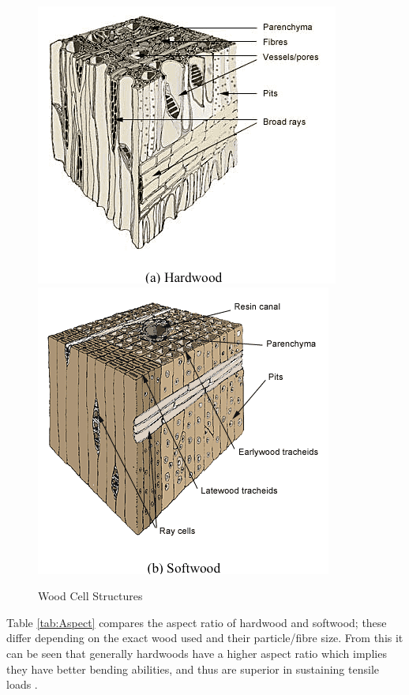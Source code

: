 \documentclass[11pt,a4paper]{article}
\numberwithin{equation}{subsection}
\begin{document}
		\begin{figure}[h]
			\includegraphics[scale=0.6]{Hardwoods}
			\includegraphics[scale=0.6]{Softwoods}	
			\caption{Wood Cell Structures \cite{_softwood_2016}}
			\label{fig:Wood}
		\end{figure}
	
	
	\noindent
	Table \ref{tab:Aspect} compares the aspect ratio of hardwood and softwood; these differ depending on the exact wood used and their particle/fibre size. From this it can be seen that generally hardwoods have a higher aspect ratio which implies they have better bending abilities, and thus are superior in sustaining tensile loads \cite{klyosov_wood-plastic_2007}. 
	
\end{document}
